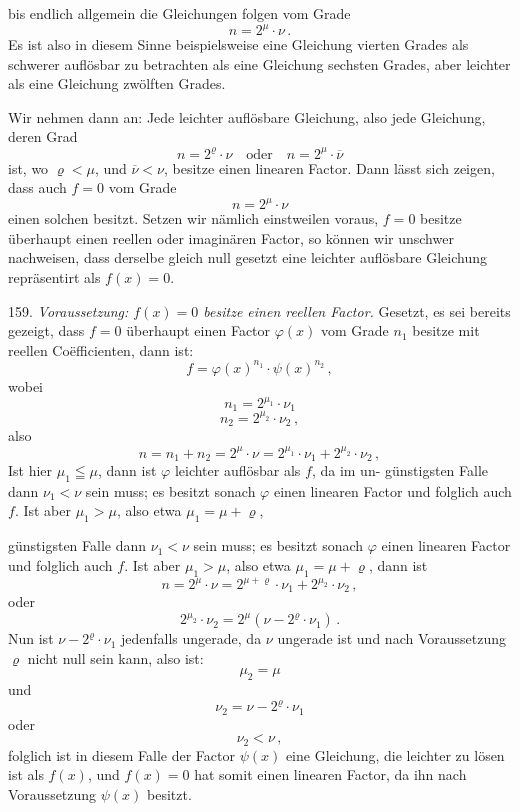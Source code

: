 \documentclass[11pt]{article}
\providecommand{\weberpage}[1]{}
\begin{document}
\weberpage{168}
bis endlich allgemein die Gleichungen folgen vom Grade
\[ n = 2^{\mu}\cdot \nu\, . \]
Es ist also in diesem Sinne beispielsweise eine Gleichung vierten
Grades als schwerer auflösbar zu betrachten als eine Gleichung sechsten
Grades, aber leichter als eine Gleichung zwölften Grades.

Wir nehmen dann an: Jede leichter auflösbare Gleichung, also
jede Gleichung, deren Grad
\[ n = 2^{\varrho}\cdot \nu \quad \text{oder} \quad n = 2^{\mu}\cdot \overline{\nu} \]
ist, wo $\varrho<\mu$, und $\overline{\nu}<\nu$, besitze einen linearen Factor. Dann lässt sich
zeigen, dass auch $f=0$ vom Grade
\[ n = 2^{\mu}\cdot \nu \]
einen solchen besitzt. Setzen wir nämlich einstweilen voraus, $f=0$
besitze überhaupt einen reellen oder imaginären Factor, so können
wir unschwer nachweisen, dass derselbe gleich null gesetzt eine leichter
auflösbare Gleichung repräsentirt als $f(x)=0$.

159. \emph{Voraussetzung: $f(x)=0$ besitze einen reellen Factor.} Gesetzt,
es sei bereits gezeigt, dass $f=0$ überhaupt einen Factor $\varphi(x)$ vom
Grade $n_1$ besitze mit reellen Co\"efficienten, dann ist:
\[ f = \varphi(x)^{n_1}\cdot \psi(x)^{n_2}\, , \]
wobei
\[ n_1 = 2^{\mu_1}\cdot \nu_1 \]
\[ n_2 = 2^{\mu_2}\cdot \nu_2\, , \]
also
\[ n = n_1+n_2 = 2^{\mu}\cdot \nu = 2^{\mu_1}\cdot \nu_1 + 2^{\mu_2}\cdot \nu_2\, , \]
Ist hier $\mu_1\leqq \mu$, dann ist $\varphi$ leichter auflösbar als $f$, da im un-
günstigsten Falle dann $\nu_1<\nu$ sein muss; es besitzt sonach $\varphi$ einen
linearen Factor und folglich auch $f$. Ist aber $\mu_1>\mu$, also etwa $\mu_1=\mu+\varrho$,


\weberpage{169}
günstigsten Falle dann $\nu_1<\nu$ sein muss; es besitzt sonach $\varphi$ einen
linearen Factor und folglich auch $f$. Ist aber $\mu_1>\mu$, also etwa $\mu_1=\mu+\varrho$,
dann ist
\[ n = 2^{\mu}\cdot \nu = 2^{\mu+\varrho}\cdot \nu_1 + 2^{\mu_2}\cdot \nu_2\, , \]
oder
\[ 2^{\mu_2}\cdot \nu_2 = 2^{\mu}(\nu-2^{\varrho}\cdot \nu_1)\, . \]
Nun ist $\nu-2^{\varrho}\cdot \nu_1$ jedenfalls ungerade, da $\nu$ ungerade ist und nach
Voraussetzung $\varrho$ nicht null sein kann, also ist:
\[ \mu_2=\mu \]
und
\[ \nu_2=\nu-2^{\varrho}\cdot \nu_1 \]
oder
\[ \nu_2<\nu\, , \]
folglich ist in diesem Falle der Factor $\psi(x)$ eine Gleichung, die leichter
zu lösen ist als $f(x)$, und $f(x)=0$ hat somit einen linearen Factor,
da ihn nach Voraussetzung $\psi(x)$ besitzt.
\end{document}
